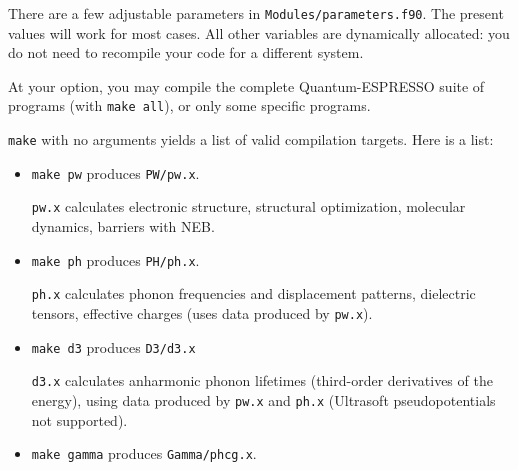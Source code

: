 \documentclass[12pt,a4paper]{article}
\begin{document}
There are a few adjustable parameters in
\texttt{Modules/parameters.f90}.
The present values will work for most cases.  All other variables are
dynamically allocated: you do not need to recompile your code for a
different system.

At your option, you may compile the complete Quantum-ESPRESSO suite of
programs (with \texttt{make all}), or only some specific programs.

\texttt{make} with no arguments yields a list of valid compilation
targets.
Here is a list:

\begin{itemize}
  \item
    \texttt{make pw} produces \texttt{PW/pw.x}.

    \texttt{pw.x} calculates electronic structure, structural
    optimization, molecular dynamics, barriers with NEB.
  \item
    \texttt{make ph} produces \texttt{PH/ph.x}.

    \texttt{ph.x} calculates phonon frequencies and displacement
    patterns, dielectric tensors, effective charges (uses data
    produced by \texttt{pw.x}).
  \item
    \texttt{make d3} produces \texttt{D3/d3.x}

    \texttt{d3.x} calculates anharmonic phonon lifetimes (third-order
    derivatives of the energy), using data produced by \texttt{pw.x}
    and \texttt{ph.x} (Ultrasoft pseudopotentials not supported).
  \item
    \texttt{make gamma} produces \texttt{Gamma/phcg.x}.


\end{itemize}
\end{document}
